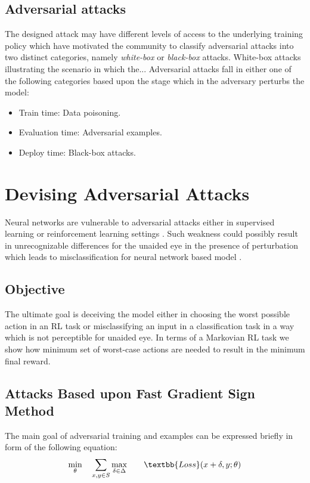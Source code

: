 \documentclass[letterpaper,12pt]{article}
\begin{document}
\subsection{Adversarial attacks}
The designed attack may have different levels of access to the underlying training policy which have motivated the community to classify adversarial attacks into two distinct categories, namely \textit{white-box} or \textit{black-box} attacks. White-box attacks illustrating the scenario in which the... Adversarial attacks fall in either one of the following categories based upon the stage which in the adversary perturbs the model:
\begin{itemize}
    \item Train time: Data poisoning.
    \item Evaluation time: Adversarial examples.
    \item Deploy time: Black-box attacks.
\end{itemize}


\section{Devising Adversarial Attacks}
Neural networks are vulnerable to adversarial attacks either in supervised learning or reinforcement learning settings \cite{Huang2017}. Such weakness could possibly result in unrecognizable differences for the unaided eye in the presence of perturbation which leads to misclassification for neural network based model \cite{Szegedy2014, Goodfellow2014}. 

\subsection{Objective}
The ultimate goal is deceiving the model either in choosing the worst possible action in an RL task or misclassifying an input in a classification task in a way which is not perceptible for unaided eye. In terms of a Markovian RL task we show how minimum set of worst-case actions are needed to result in the minimum final reward. 


\subsection{Attacks Based upon Fast Gradient Sign Method}

The main goal of adversarial training and examples can be expressed briefly in form of the following equation:
\begin{equation}
\begin{aligned}
& \underset{\theta}{\min}
& & \sum_{x,y \in S} \underset{\delta \in \Delta}{\max}
& & & \textbb{Loss}(x + \delta, y; \theta)
\end{aligned}
\end{equation}
\end{document}
